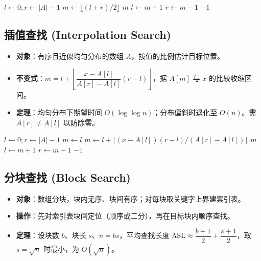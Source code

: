 \begin{algorithm}[H]
\caption{二分查找规约}
\begin{algorithmic}[1]
    \State $l\gets0; r\gets|A|-1$
        \State $m\gets\lfloor(l+r)/2\rfloor$
         \Return $m$  $l\gets m+1$ \Else $r\gets m-1$ \EndIf
    \EndWhile
    \State \Return $-1$
\EndProcedure
\end{algorithmic}
\end{algorithm}

\subsection{插值查找 (Interpolation Search)}
\begin{itemize}
    \item \textbf{对象}：有序且近似均匀分布的数组 $A$，按值的比例估计目标位置。
    \item \textbf{不变式}：$m=l+\left\lfloor\dfrac{x-A[l]}{A[r]-A[l]}(r-l)\right\rfloor$，据 $A[m]$ 与 $x$ 的比较收缩区间。
    \item \textbf{定理}：均匀分布下期望时间 $O(\log\log n)$；分布偏斜时退化至 $O(n)$。需 $A[r]\neq A[l]$ 以防除零。
\end{itemize}

\begin{algorithm}[H]
\caption{插值查找规约}
\begin{algorithmic}[1]
    \State $l\gets0; r\gets|A|-1$
         \State $m\gets l$ \Else $m\gets l+\lfloor (x-A[l])(r-l)/(A[r]-A[l])\rfloor$ \EndIf
         \Return $m$  $l\gets m+1$ \Else $r\gets m-1$ \EndIf
    \EndWhile
    \State \Return $-1$
\EndProcedure
\end{algorithmic}
\end{algorithm}

\subsection{分块查找 (Block Search)}
\begin{itemize}
    \item \textbf{对象}：数组分块，块内无序、块间有序；对每块取关键字上界建索引表。
    \item \textbf{操作}：先对索引表块间定位（顺序或二分），再在目标块内顺序查找。
    \item \textbf{定理}：设块数 $b$、块长 $s$、$n=bs$，平均查找长度 $\text{ASL}\approx\dfrac{b+1}{2}+\dfrac{s+1}{2}$，取 $s=\sqrt n$ 时最小，为 $O(\sqrt n)$。
\end{itemize}

